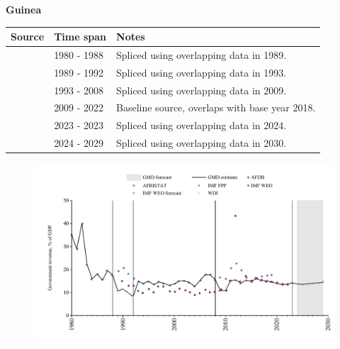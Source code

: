 \documentclass[12pt,a4paper,landscape]{article}
\begin{document}
\begin{adjustbox}{max totalsize={\paperwidth}{\paperheight},center}
\begin{minipage}[t][\textheight][t]{\textwidth}
\vspace*{0.5cm}
{}
\begin{center}
{\Large\bfseries Guinea}
\end{center}
\vspace{0.5cm}
\begin{table}[H]
\centering
\small
\begin{tabular}{|l|l|l|}
\hline
\textbf{Source} & \textbf{Time span} & \textbf{Notes} \\
\hline
\rowcolor{white}\cite{AFDB}& 1980 - 1988 &Spliced using overlapping data in 1989.\\
\rowcolor{lightgray}\cite{WDI}& 1989 - 1992 &Spliced using overlapping data in 1993.\\
\rowcolor{white}\cite{AFDB}& 1993 - 2008 &Spliced using overlapping data in 2009.\\
\rowcolor{lightgray}\cite{AFRISTAT}& 2009 - 2022 &Baseline source, overlaps with base year 2018.\\
\rowcolor{white}\cite{IMF_FPP}& 2023 - 2023 &Spliced using overlapping data in 2024.\\
\rowcolor{lightgray}\cite{IMF_WEO_forecast}& 2024 - 2029 &Spliced using overlapping data in 2030.\\
\hline
\end{tabular}
\end{table}
\begin{figure}[H]
\centering
\includegraphics[width=\textwidth,height=0.6\textheight,keepaspectratio]{graphs/GIN_govrev_GDP.pdf}
\end{figure}
\end{minipage}
\end{adjustbox}
\end{document}

